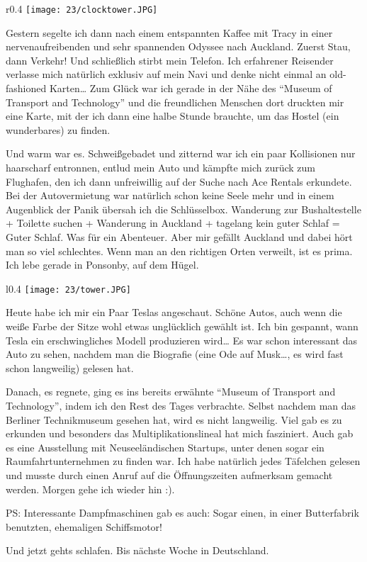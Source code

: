 \begin{wrapfigure}[18]{r}{0.4\textwidth}
  \centering
  \texttt{[image: 23/clocktower.JPG]}
\end{wrapfigure}
Gestern segelte ich dann nach einem entspannten Kaffee mit Tracy in
einer nervenaufreibenden und sehr spannenden Odyssee nach Auckland.
Zuerst Stau, dann Verkehr! Und schließlich stirbt mein Telefon. Ich
erfahrener Reisender verlasse mich natürlich exklusiv auf mein Navi und
denke nicht einmal an old-fashioned Karten\ldots{} Zum Glück war ich
gerade in der Nähe des ``Museum of Transport and Technology'' und die
freundlichen Menschen dort druckten mir eine Karte, mit der ich dann
eine halbe Stunde brauchte, um das Hostel (ein wunderbares) zu finden.

Und warm war es. Schweißgebadet und zitternd war ich ein paar
Kollisionen nur haarscharf entronnen, entlud mein Auto und kämpfte
mich zurück zum Flughafen, den ich dann unfreiwillig auf der Suche
nach Ace Rentals erkundete. Bei der Autovermietung war natürlich schon
keine Seele mehr und in einem Augenblick der Panik übersah ich die
Schlüsselbox.  Wanderung zur Bushaltestelle + Toilette suchen +
Wanderung in Auckland + tagelang kein guter Schlaf = Guter Schlaf. Was
für ein Abenteuer. Aber mir gefällt Auckland und dabei hört man so
viel schlechtes. Wenn man an den richtigen Orten verweilt, ist es
prima. Ich lebe gerade in Ponsonby, auf dem Hügel.

\begin{wrapfigure}[18]{l}{0.4\textwidth}
  \centering
  \texttt{[image: 23/tower.JPG]}
\end{wrapfigure}
Heute habe ich mir ein Paar Teslas angeschaut. Schöne Autos, auch wenn
die weiße Farbe der Sitze wohl etwas unglücklich gewählt ist. Ich bin
gespannt, wann Tesla ein erschwingliches Modell produzieren wird\ldots{}
Es war schon interessant das Auto zu sehen, nachdem man die Biografie
(eine Ode auf Musk\ldots, es wird fast schon langweilig) gelesen hat.

Danach, es regnete, ging es ins bereits erwähnte ``Museum of Transport
and Technology'', indem ich den Rest des Tages verbrachte. Selbst
nachdem man das Berliner Technikmuseum gesehen hat, wird es nicht
langweilig.  Viel gab es zu erkunden und besonders das
Multiplikationslineal hat mich fasziniert. Auch gab es eine
Ausstellung mit Neuseeländischen Startups, unter denen sogar ein
Raumfahrtunternehmen zu finden war. Ich habe natürlich jedes Täfelchen
gelesen und musste durch einen Anruf auf die Öffnungszeiten aufmerksam
gemacht werden. Morgen gehe ich wieder hin :).

PS: Interessante Dampfmaschinen gab es auch: Sogar einen, in einer
Butterfabrik benutzten, ehemaligen Schiffsmotor!

Und jetzt gehts schlafen. Bis nächste Woche in Deutschland.
